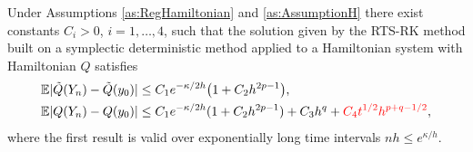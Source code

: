 \documentclass{siamart1116}
\numberwithin{theorem}{section}
\DeclarePairedDelimiter{\abs}{\lvert}{\rvert}
\newcommand{\E}{\operatorname{\mathbb{E}}}
\newcommand{\corr}[1]{{\color{red}#1}}
\begin{document}
\begin{theorem}\label{thm:RTSHamiltonian} Under Assumptions \ref{as:RegHamiltonian} and \ref{as:AssumptionH} there exist constants $C_i > 0$, $i = 1, \ldots, 4$, such that \corr{the solution given by the RTS-RK method built on a symplectic deterministic method applied to a Hamiltonian system with Hamiltonian $Q$ satisfies} 
	\begin{align}
		\E \abs{\tilde Q(Y_n) - \tilde Q(y_0)} &\leq C_1 e^{-\kappa/2h}\big(1 + C_2 h^{2p-1}\big), \\
		\E \abs{Q(Y_n) - Q(y_0)} &\leq C_1 e^{-\kappa/2h}(1 + C_2 h^{2p-1}) + C_3 h^q + \corr{C_4 t^{1/2} h^{p+q-1/2}}, \label{eq:ErrorHamiltonian}
	\end{align}
	where the first result is valid over exponentially long time intervals $nh \leq e^{\kappa / h}$.
\end{theorem}
\end{document}
